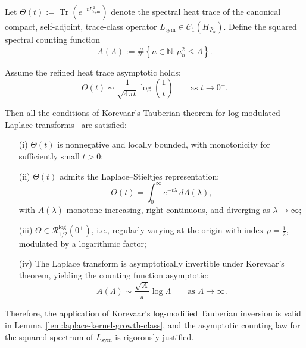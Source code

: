 \begin{lemma}
\label{lem:korevaar_tauberian_constants_verified}
Let \( \Theta(t) := \operatorname{Tr}(e^{-t L_{\mathrm{sym}}^2}) \) denote the spectral heat trace of the canonical compact, self-adjoint, trace-class operator \( L_{\mathrm{sym}} \in \mathcal{C}_1(H_{\Psi_\alpha}) \). Define the squared spectral counting function
\[
A(\Lambda) := \#\left\{ n \in \mathbb{N} : \mu_n^2 \le \Lambda \right\}.
\]

Assume the refined heat trace asymptotic holds:
\[
\Theta(t) \sim \frac{1}{\sqrt{4\pi t}} \log\left( \frac{1}{t} \right) \qquad \text{as } t \to 0^+.
\]

Then all the conditions of Korevaar’s Tauberian theorem for log-modulated Laplace transforms~\cite[Ch.~III, Thm.~5.5]{Korevaar2004Tauberian} are satisfied:
\begin{enumerate}
  \item[\textnormal{(i)}] \( \Theta(t) \) is nonnegative and locally bounded, with monotonicity for sufficiently small \( t > 0 \);
  
  \item[\textnormal{(ii)}] \( \Theta(t) \) admits the Laplace–Stieltjes representation:
  \[
  \Theta(t) = \int_0^\infty e^{-t \lambda} \, dA(\lambda),
  \]
  with \( A(\lambda) \) monotone increasing, right-continuous, and diverging as \( \lambda \to \infty \);
  
  \item[\textnormal{(iii)}] \( \Theta \in \mathcal{R}_{1/2}^{\log}(0^+) \), i.e., regularly varying at the origin with index \( \rho = \tfrac{1}{2} \), modulated by a logarithmic factor;
  
  \item[\textnormal{(iv)}] The Laplace transform is asymptotically invertible under Korevaar’s theorem, yielding the counting function asymptotic:
  \[
  A(\Lambda) \sim \frac{\sqrt{\Lambda}}{\pi} \log \Lambda \qquad \text{as } \Lambda \to \infty.
  \]
\end{enumerate}

\noindent
Therefore, the application of Korevaar’s log-modified Tauberian inversion is valid in Lemma~\ref{lem:laplace-kernel-growth-class}, and the asymptotic counting law for the squared spectrum of \( L_{\mathrm{sym}} \) is rigorously justified.
\end{lemma}
